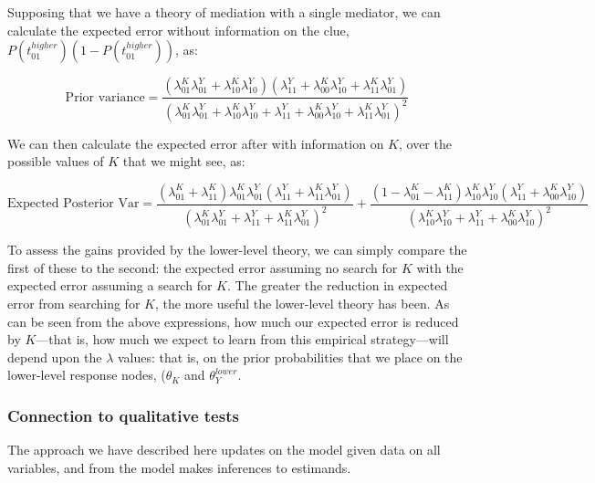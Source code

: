 \documentclass[12pt,]{book}
\begin{document}
Supposing that we have a theory of mediation with a single mediator, we can calculate the expected error without information on the clue, \(P(t_{01}^{higher})(1-P(t_{01}^{higher}))\), as:

\[\text{Prior variance} = \frac{\left(\lambda_{01}^{K}\lambda_{01}^{Y} + \lambda_{10}^{K}\lambda_{10}^{Y}\right)\left(\lambda_{11}^{Y} + \lambda_{00}^{K}\lambda_{10}^{Y} + \lambda_{11}^{K}\lambda_{01}^{Y}\right)}
 {\left(\lambda_{01}^{K}\lambda_{01}^{Y} + \lambda_{10}^{K}\lambda_{10}^{Y}  +\lambda_{11}^{Y} + \lambda_{00}^{K}\lambda_{10}^{Y} + \lambda_{11}^{K}\lambda_{01}^{Y}\right)^2}\]

We can then calculate the expected error after with information on \(K\), over the possible values of \(K\) that we might see, as:

\[\text{Expected Posterior Var} = \frac{\left(\lambda_{01}^{K}+\lambda_{11}^{K}\right) \lambda_{01}^{K}\lambda_{01}^{Y}\left(\lambda_{11}^{Y}+\lambda_{11}^{K}\lambda_{01}^{Y} \right) }
 {\left(\lambda_{01}^{K}\lambda_{01}^{Y}  +\lambda_{11}^{Y} +  \lambda_{11}^{K}\lambda_{01}^{Y}\right)^2}+
 \frac{\left(1-\lambda_{01}^{K}-\lambda_{11}^{K}\right)\lambda_{10}^{K}\lambda_{10}^{Y}\left(\lambda_{11}^{Y} +  \lambda_{00}^{K}\lambda_{10}^{Y}\right) }
 {\left(\lambda_{10}^{K}\lambda_{10}^{Y}  +\lambda_{11}^{Y} +  \lambda_{00}^{K}\lambda_{10}^{Y}\right)^2}\]

To assess the gains provided by the lower-level theory, we can simply compare the first of these to the second: the expected error assuming no search for \(K\) with the expected error assuming a search for \(K\). The greater the reduction in expected error from searching for \(K\), the more useful the lower-level theory has been. As can be seen from the above expressions, how much our expected error is reduced by \(K\)---that is, how much we expect to learn from this empirical strategy---will depend upon the \(\lambda\) values: that is, on the prior probabilities that we place on the lower-level response nodes, (\(\theta_K\) and \(\theta_Y^{lower}\).

\hypertarget{connection-to-qualitative-tests}{%
\subsubsection{Connection to qualitative tests}\label{connection-to-qualitative-tests}}

The approach we have described here updates on the model given data on all variables, and from the model makes inferences to estimands.
\end{document}
